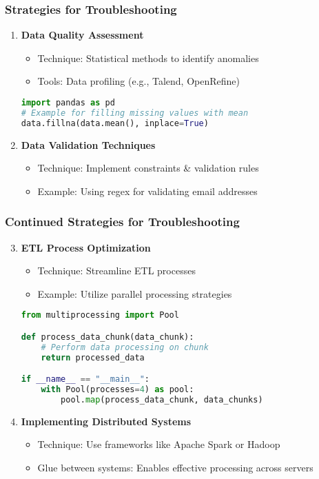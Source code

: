 \documentclass[aspectratio=169]{beamer}
\begin{document}
\begin{frame}[fragile]
  \frametitle{Strategies for Troubleshooting}
  \begin{enumerate}
    \item \textbf{Data Quality Assessment}
      \begin{itemize}
        \item Technique: Statistical methods to identify anomalies
        \item Tools: Data profiling (e.g., Talend, OpenRefine)
      \end{itemize}
      \begin{lstlisting}[language=Python]
import pandas as pd
# Example for filling missing values with mean
data.fillna(data.mean(), inplace=True)
      \end{lstlisting}

    \item \textbf{Data Validation Techniques}
      \begin{itemize}
        \item Technique: Implement constraints & validation rules
        \item Example: Using regex for validating email addresses
      \end{itemize}
  \end{enumerate}
\end{frame}

\begin{frame}[fragile]
  \frametitle{Continued Strategies for Troubleshooting}
  \begin{enumerate}
    \setcounter{enumi}{2}
    \item \textbf{ETL Process Optimization}
      \begin{itemize}
        \item Technique: Streamline ETL processes
        \item Example: Utilize parallel processing strategies
      \end{itemize}
      \begin{lstlisting}[language=Python]
from multiprocessing import Pool

def process_data_chunk(data_chunk):
    # Perform data processing on chunk
    return processed_data

if __name__ == "__main__":
    with Pool(processes=4) as pool:
        pool.map(process_data_chunk, data_chunks)
      \end{lstlisting}

    \item \textbf{Implementing Distributed Systems}
      \begin{itemize}
        \item Technique: Use frameworks like Apache Spark or Hadoop
        \item Glue between systems: Enables effective processing across servers
      \end{itemize}
  \end{enumerate}
\end{frame}
\end{document}
